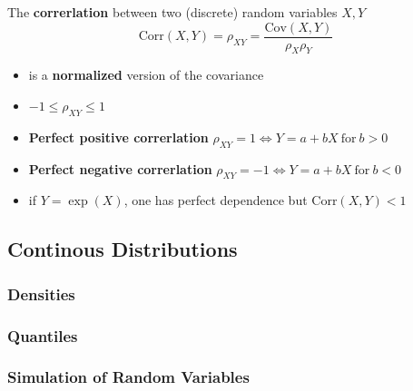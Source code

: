 \newpar{}
The \textbf{correrlation} between two (discrete) random variables $X,Y$
\noindent\begin{equation*}
    \mathrm{Corr}(X,Y)=\rho_{XY}=\frac{\mathrm{Cov}(X,Y)}{\rho_{X}\rho_{Y}}
\end{equation*}
\begin{itemize}
    \item is a \textbf{normalized} version of the covariance
    \item $-1 \leq \rho_{XY} \leq 1$
    \item \textbf{Perfect positive correrlation} $\rho_{XY}=1\Leftrightarrow Y=a+bX\mathrm{~for~}b>0$
    \item \textbf{Perfect negative correrlation} $\rho_{XY}=-1\Leftrightarrow Y=a+bX\mathrm{~for~}b<0$
    \item if $Y=\exp(X)$, one has perfect dependence but $\mathrm{Corr}(X,Y)<1$
\end{itemize}

\subsection{Continous Distributions}

\subsubsection{Densities}

\subsubsection{Quantiles}

\subsubsection{Simulation of Random Variables}

